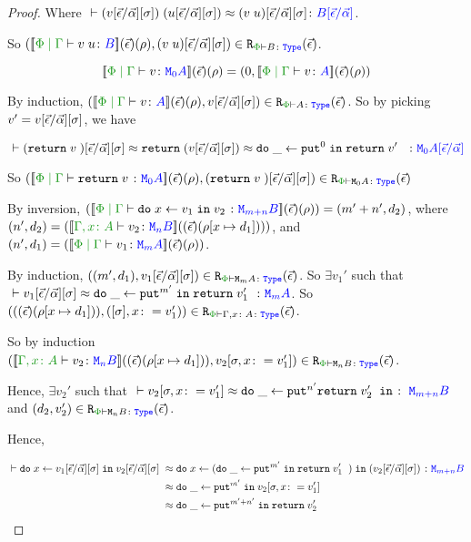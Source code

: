 \begin{framed}
\begin{proof}
        Where $\zberelation{\apply{(v\fundSub)}{(u\fundSub)}}{(\apply{v}{u})\fundSub}{B\ssub{\av}{\ev}}$.
        
        So $\inLogRelPE{\deno{\gpetyperelation{\apply{v}{u}}{B}}\fundRho}{(\apply{v}{u})\fundSub}{B}$.
        
        
        \case{\vreturn}
        
        \begin{equation}
            \deno{\gpetyperelation{v}{\M{0}{A}}}\fundRho = (0, \deno{\gpetyperelation{v}{A}}\fundRho)
        \end{equation}
        
        By induction, $\inLogRelPE{\deno{\gpetyperelation{v}{A}}\fundRho}{v\fundSub}{A}$. So by picking $v' = v[\vec{\epsilon} / \vec{\alpha}][\sigma]$, we have
        
        \begin{equation}
            \zberelation{(\return{v})\fundSub}{\return{(v\fundSub)\beequiv \doin{\_}{\put^0}{\return{v'}}}}{\M{0}{A\ssub{\av}{\ev}}}
        \end{equation}
        
        So $\inLogRelPE{\deno{\gpetyperelation{\return{v}}{\M{0}{A}}}\fundRho}{(\return{v})\fundSub}{\M{0}{A}}$
        
        \case{\vbind}
        
        By inversion, $(\deno{\gpetyperelation{\doin{x}{v_1}{v_2}}{\M{m+n}{B}}}\fundRho) = (m'+n', d_2)$, where $(n', d_2) = (\deno{\typerelation{\gax}{v_2}{\mnb}}(\fundRhoExt{[x\mapsto d_1]}))$, and $(n', d_1) = (\deno{\gpetyperelation{v_1}{\mma}}\fundRho)$.
        
        By induction, $\inLogRelPE{(m', d_1)}{v_1\fundSub}{\mma}$. So $\exists v_1'$ such that $\zberelation{v_1\fundSub}{\doin{\_}{\put^{m'}}{\return{v_1'}}}{\mma}$. So $\inLogRelPE{(\fundRhoExt{[x\mapsto d_1]})}{(\ssi, x\setto v_1')}{\gax}$.
        
        So by induction $\inLogRelPE{\deno{\typerelation{\gax}{v_2}{\mnb}}(\fundRhoExt{[x\mapsto d_1]})}{v_2\sub{\si, x\setto v_1'}}{\mnb}$.
        
        Hence, $\exists v_2'$ such that $\zberelation{v_2\sub{\si, x\setto v_1'}}{\doin{\_}{\put^{n'}{\return{v_2'}}}}{\M{m + n}{B}}$ and $\inLogRelPE{d_2}{v_2'}{\mnb}$.
        
        Hence,
        
        \begin{align*}
            \zberelation{\doin{x}{v_1\fundSub}{v_2\fundSub}&}{\doin{x}{(\doin{\_}{\put^{m'}}{\return{v_1'}})}{(v_2\fundSub)}}{\M{m+n}{B}}\\
            &\beequiv\doin{\_}{\put^{m'}}{v_2\sub{\si, x\setto{v_1'}}}\\
            &\beequiv\doin{\_}{\put^{m'+n'}}{\return{v_2'}}
        \end{align*}
        

\end{proof}
\end{framed}
